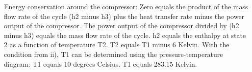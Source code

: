 Energy conservation around the compressor:
Zero equals the product of the mass flow rate of the cycle (h2 minus h3) plus the heat transfer rate minus the power output of the compressor.
The power output of the compressor divided by (h2 minus h3) equals the mass flow rate of the cycle.
h2 equals the enthalpy at state 2 as a function of temperature T2.
T2 equals T1 minus 6 Kelvin.
With the condition from ii), T1 can be determined using the pressure-temperature diagram: T1 equals 10 degrees Celsius.
T1 equals 283.15 Kelvin.